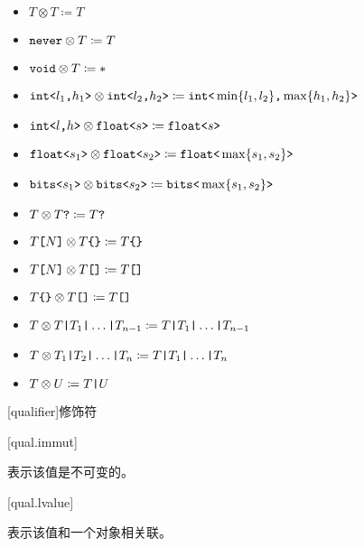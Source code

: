 \begin{itemize}
\item $T \otimes T \coloneqq T$
\item $\texttt{never} \otimes T \coloneqq T$
\item $\texttt{void} \otimes T \coloneqq \ast$
\item $\texttt{int<}l_1\texttt{,}h_1\texttt{>} \otimes \texttt{int<}l_2\texttt{,}h_2\texttt{>} \coloneqq \texttt{int<}\min\{l_1, l_2\}\texttt{,}\max\{h_1, h_2\}\texttt{>}$
\item $\texttt{int<}l\texttt{,}h\texttt{>} \otimes \texttt{float<}s\texttt{>} \coloneqq \texttt{float<}s\texttt{>}$
\item $\texttt{float<}s_1\texttt{>} \otimes \texttt{float<}s_2\texttt{>} \coloneqq \texttt{float<}\max\{s_1, s_2\}\texttt{>}$
\item $\texttt{bits<}s_1\texttt{>} \otimes \texttt{bits<}s_2\texttt{>} \coloneqq \texttt{bits<}\max\{s_1, s_2\}\texttt{>}$
\item $T \otimes T\texttt{?} \coloneqq T\texttt{?}$
\item $T\texttt{[}N\texttt{]} \otimes T\texttt{\{\}} \coloneqq T\texttt{\{\}}$
\item $T\texttt{[}N\texttt{]} \otimes T\texttt{[]} \coloneqq T\texttt{[]}$
\item $T\texttt{\{\}} \otimes T\texttt{[]} \coloneqq T\texttt{[]}$
\item $T \otimes T \texttt{|} T_1 \texttt{|} \ldots \texttt{|} T_{n-1} \coloneqq T \texttt{|} T_1 \texttt{|} \ldots \texttt{|} T_{n-1}$
\item $T \otimes T_1 \texttt{|} T_2 \texttt{|} \ldots \texttt{|} T_n \coloneqq T \texttt{|} T_1 \texttt{|} \ldots \texttt{|} T_n$
\item $T \otimes U \coloneqq T \texttt{|} U$
\end{itemize}

[qualifier]{修饰符}

[qual.immut]{}

\pnum
{} 表示该值是不可变的。

[qual.lvalue]{}

\pnum
{} 表示该值和一个对象相关联。
